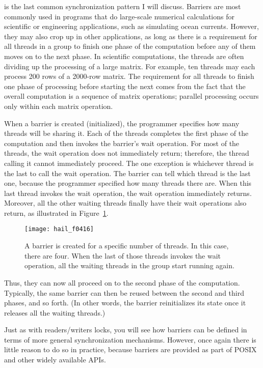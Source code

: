  is the last common synchronization pattern I
will discuss.  Barriers are most commonly used in programs that do
large-scale numerical calculations for scientific or engineering
applications, such as simulating ocean currents.  However, they may
also crop up in other applications, as long as there is a requirement
for all threads in a group to finish one phase of the computation
before any of them moves on to the next phase.  In scientific
computations, the threads are often dividing up the processing of a
large matrix.  For example, ten threads may each process 200 rows of a
2000-row matrix.  The requirement for all threads to finish one phase
of processing before starting the next comes from the fact that the
overall computation is a sequence of matrix operations; parallel
processing occurs only within each matrix operation.

When a barrier is created (initialized), the programmer specifies how
many threads will be sharing it.  Each of the threads completes the first
phase of the computation and then invokes the barrier's wait
operation.  For most of the threads, the wait operation does not
immediately return; therefore, the thread calling it cannot
immediately proceed.  The one exception is whichever thread is the
last to call the
wait operation.  The barrier can tell which thread is the last one,
because the programmer specified how many threads there are.  When this last
thread invokes the wait operation, the wait operation immediately
returns.  Moreover, all the other waiting threads finally have their
wait operations also return, as illustrated in Figure~\ref{scan-4-9}.
\begin{figure}
\centerline{\texttt{[image: hail\_f0416]}}
\caption{A barrier is created for a specific number of threads.
In this case, there are
  four.  When the last of those threads invokes the wait operation,
  all the waiting threads in the group start running again.}
\label{scan-4-9}
\end{figure}
Thus, they can now all proceed on to the
second phase of the computation.  Typically, the same barrier can then
be reused between the second and third phases, and so forth.  (In other words,
the barrier reinitializes its state once it releases all the waiting
threads.)

Just as with readers/writers locks, you will see how barriers can be
defined in terms of more general synchronization mechanisms.  However,
once again there is little reason to do so in practice, because barriers
are provided as part of POSIX and other widely available APIs.

